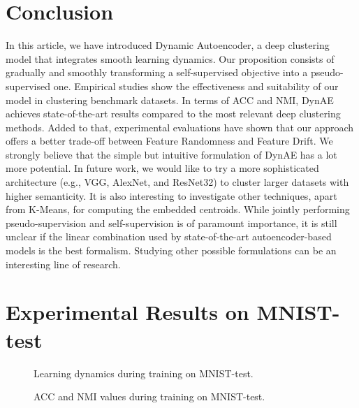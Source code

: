 \documentclass{article}
\begin{document}
\section{Conclusion}
In this article, we have introduced Dynamic Autoencoder, a deep clustering model that integrates smooth learning dynamics. Our proposition consists of gradually and smoothly transforming a self-supervised objective into a pseudo-supervised one. Empirical studies show the effectiveness and suitability of our model in clustering benchmark datasets. In terms of ACC and NMI, DynAE achieves state-of-the-art results compared to the most relevant deep clustering methods. Added to that, experimental evaluations have shown that our approach offers a better trade-off between Feature Randomness and Feature Drift. We strongly believe that the simple but intuitive formulation of DynAE has a lot more potential. In future work, we would like to try a more sophisticated architecture (e.g., VGG, AlexNet, and ResNet32) to cluster larger datasets with higher semanticity. It is also interesting to investigate other techniques, apart from K-Means, for computing the embedded centroids. While jointly performing pseudo-supervision and self-supervision is of paramount importance, it is still unclear if the linear combination used by state-of-the-art autoencoder-based models is the best formalism. Studying other possible formulations can be an interesting line of research.




\newpage
\appendix

\section{Experimental Results on MNIST-test}
\label{MNIST-test}

\begin{figure*}[!ht]
\vskip 0.2in
\centering
    \caption{Learning dynamics during training on MNIST-test.}
\label{fig:loss_nb_MNIST-TEST}
\vskip 0.2in
\end{figure*}

\begin{figure*}[!ht]
\vskip 0.2in
\centering
    \caption{ACC and NMI values during training on MNIST-test.}
\label{fig:ACC_NMI_MNIST-TEST}
\vskip 0.2in
\end{figure*}
\end{document}
